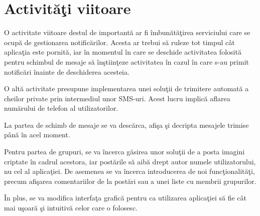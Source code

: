 \section{Activit\u{a}\c{t}i viitoare}

O activitate viitoare destul de important\u{a} ar fi \^{i}mbun\u{a}t\u{a}\c{t}irea serviciului care se ocup\u{a} de gestionarea notific\u{a}rilor. Acesta ar trebui s\u{a} ruleze tot timpul c\^{a}t aplica\c{t}ia este pornit\u{a}, iar \^{i}n momentul \^{i}n care se deschide activitatea folosit\u{a} pentru schimbul de mesaje s\u{a} \^{i}n\c{s}tiin\c{t}eze activitatea \^{i}n cazul \^{i}n care s-au primit notific\u{a}ri \^{i}nainte de deschiderea acesteia.

O alt\u{a} activitate presupune implementarea unei solu\c{t}ii de trimitere automat\u{a} a cheilor private prin intermediul unor SMS-uri. Acest lucru implic\u{a} aflarea num\u{a}rului de telefon al utilizatorilor.

La partea de schimb de mesaje se va desc\u{a}rca, afi\c{s}a \c{s}i decripta mesajele trimise p\^{a}n\u{a} \^{i}n acel moment.

Pentru partea de grupuri, se va \^{i}ncerca g\u{a}sirea unor solu\c{t}ii de a posta imagini criptate \^{i}n cadrul acestora, iar post\u{a}rile s\u{a} aib\u{a} drept autor numele utilizatorului, nu cel al aplica\c{t}iei. De asemenea se va \^{i}ncerca introducerea de noi func\c{t}ionalit\u{a}\c{t}i, precum afi\c{s}area comentariilor de la post\u{a}ri sau a unei liste cu membrii grupurilor.

\^{I}n plus, se va modifica interfa\c{t}a grafic\u{a} pentru ca utilizarea aplica\c{t}iei s\u{a} fie c\^{a}t mai u\c{s}oar\u{a} \c{s}i intuitiv\u{a} celor care o folosesc. 